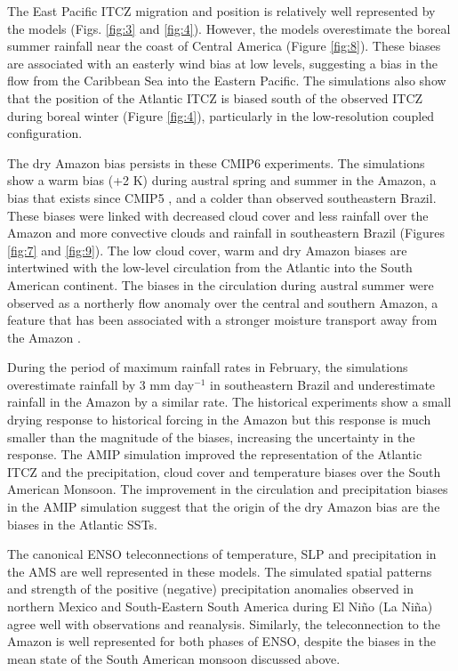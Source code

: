 The East Pacific ITCZ migration and position is relatively well represented by the models (Figs. \ref{fig:3} and \ref{fig:4}). However, the models overestimate the boreal summer rainfall near the coast of Central America (Figure \ref{fig:8}). These biases are associated with an easterly wind bias at low levels, suggesting a bias in the flow from the Caribbean Sea into the Eastern Pacific.
The simulations also show that the position of the Atlantic ITCZ is biased south of the observed ITCZ  during boreal winter (Figure \ref{fig:4}), particularly in the low-resolution coupled configuration. 

The dry Amazon bias persists in these CMIP6 experiments. 
The simulations show a warm bias (+2 K) during austral spring and summer in the Amazon, a bias that exists since CMIP5 \citep{jones2013}, and a colder than observed southeastern Brazil.
 These biases were linked with decreased cloud cover and less rainfall over the Amazon and more convective clouds and rainfall in southeastern Brazil (Figures \ref{fig:7} and \ref{fig:9}). 
The low cloud cover, warm and dry Amazon biases are intertwined with the low-level circulation from the Atlantic into the South American continent. The biases in the circulation during austral summer were observed as a northerly flow anomaly over the central and southern Amazon, a feature that has been associated with a stronger moisture transport away from the Amazon \citep{marengo2012,jones2017}. %


During the period of maximum rainfall rates in February, the simulations overestimate rainfall by 3 mm day$^{-1}$ in southeastern Brazil and underestimate rainfall in the Amazon by a similar rate. The historical experiments show a small drying response to historical forcing in the Amazon  but this response is much smaller than the magnitude of the biases, increasing the uncertainty in the response.
The AMIP simulation improved the representation of the Atlantic ITCZ and the precipitation, cloud cover and temperature biases over the South American Monsoon.   The improvement in the circulation and precipitation biases in the AMIP simulation suggest that the origin of the dry Amazon bias are the biases in the Atlantic SSTs. 
  
The canonical ENSO teleconnections of  temperature, SLP and precipitation in the AMS are well represented in these models. The simulated spatial patterns and strength of the positive (negative) precipitation anomalies observed in northern Mexico and South-Eastern South America during El Ni\~no (La Ni\~na) agree well with observations and reanalysis.
 Similarly, the teleconnection to the Amazon is well represented for both phases of ENSO, despite the biases in the mean state of the South American monsoon discussed above. %
 
